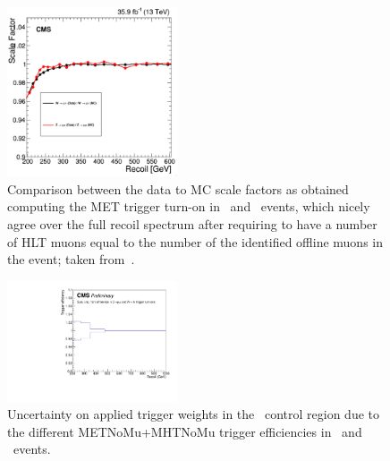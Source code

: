 \begin{figure}[hbtp]\begin{center}
      \includegraphics[width=0.45\textwidth]{figures/trigs/scale_factor_trigger_wmn_zmm_after_fix.png}
      \caption{
        Comparison between the data to MC scale factors as obtained computing the MET trigger turn-on in \Wmn~and \Zmm~events, which nicely agree over the full recoil spectrum after requiring to have a number of HLT muons equal to the number of the identified offline muons in the event; taken from~\cite{CMS_AN_2016-473}.}
      \label{fig:trigger_eff_corr}\end{center}\end{figure}

\begin{figure}[hbtp]\begin{center}
      \includegraphics[width=0.45\textwidth]{figures/trigs/fixtrig_monoh.pdf}
      \caption{ Uncertainty on applied trigger weights in the \Zmm~control region due to the different METNoMu+MHTNoMu trigger efficiencies  in \Wmn~and \Zmm~events.
}
      \label{fig:fixtrig_monoh}\end{center}\end{figure}


